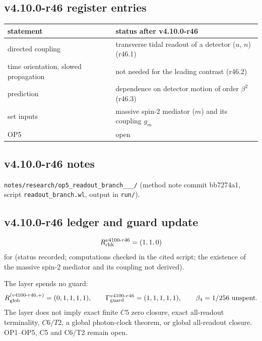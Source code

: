 \subsection*{v4.10.0-r46 register entries}
\label{subsec:v4100-r46-register}

\begin{center}
\small
\begin{tabular}{@{}>{\raggedright\arraybackslash}p{}>{\raggedright\arraybackslash}p{}@{}}
\toprule
statement & status after v4.10.0-r46\\
\midrule
directed coupling & transverse tidal readout of a detector (\(u\), \(n\)) (r46.1)\\
time orientation, slowed propagation & not needed for the leading contrast (r46.2)\\
prediction & dependence on detector motion of order \(\beta^2\) (r46.3)\\
set inputs & massive spin-2 mediator (\(m\)) and its coupling \(g_m\)\\
OP5 & open\\
\bottomrule
\end{tabular}
\end{center}

\subsection*{v4.10.0-r46 notes}
\label{subsec:v4100-r46-notes}

\texttt{notes/\allowbreak research/\allowbreak op5\_\allowbreak readout\_\allowbreak branch\_\_\_/} (method note commit bb7274a1,
script \texttt{readout\_\allowbreak branch.wl}, output in \texttt{run/}).

\subsection*{v4.10.0-r46 ledger and guard update}
\label{subsec:v4100-r46-ledger-guard}

\[
R_{\rm chk}^{v4100\text{-}r46}=(1,1,0)
\]
for (status recorded; computations checked in the cited script; the existence of the massive spin-2 mediator and its coupling not derived).

The layer spends no guard:
\[
R_{\rm glob}^{(v4100\text{-}r46,+)}=(0,1,1,1,1),
\qquad
\Gamma_{\rm guard}^{v4100\text{-}r46}=(1,1,1,1,1),
\qquad
\beta_4=1/256\ \text{unspent}.
\]
The layer does not imply exact finite \(C5\) zero closure, exact all-readout terminality, \(C6/T2\), a global photon-clock theorem,
or global all-readout closure.  OP1--OP5, C5 and C6/T2 remain open.

